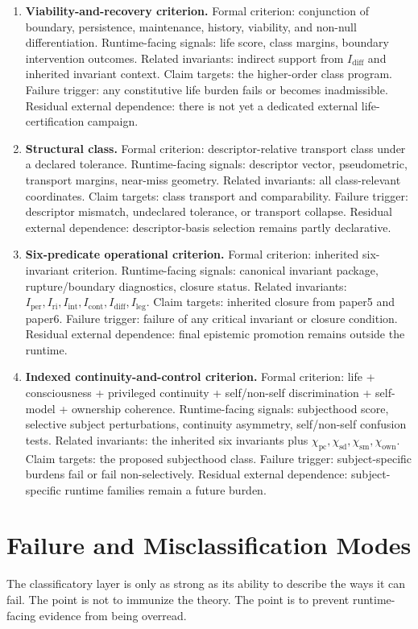 \documentclass[11pt,a4paper]{article}
\theoremstyle{definition}
\newcommand{\Iper}{I_{\mathrm{per}}}
\newcommand{\Iri}{I_{\mathrm{ri}}}
\newcommand{\Iint}{I_{\mathrm{int}}}
\newcommand{\Icont}{I_{\mathrm{cont}}}
\newcommand{\Idiff}{I_{\mathrm{diff}}}
\newcommand{\Ileg}{I_{\mathrm{leg}}}
\newcommand{\Priv}{\chi_{\mathrm{pc}}}
\newcommand{\SelfDisc}{\chi_{\mathrm{sd}}}
\newcommand{\SelfModel}{\chi_{\mathrm{sm}}}
\newcommand{\Own}{\chi_{\mathrm{own}}}
\begin{document}
\begin{enumerate}[leftmargin=*,itemsep=0.5em]
\item \textbf{Viability-and-recovery criterion.} Formal criterion: conjunction of boundary, persistence, maintenance, history, viability, and non-null differentiation. Runtime-facing signals: life score, class margins, boundary intervention outcomes. Related invariants: indirect support from $\Idiff$ and inherited invariant context. Claim targets: the higher-order class program. Failure trigger: any constitutive life burden fails or becomes inadmissible. Residual external dependence: there is not yet a dedicated external life-certification campaign.

\item \textbf{Structural class.} Formal criterion: descriptor-relative transport class under a declared tolerance. Runtime-facing signals: descriptor vector, pseudometric, transport margins, near-miss geometry. Related invariants: all class-relevant coordinates. Claim targets: class transport and comparability. Failure trigger: descriptor mismatch, undeclared tolerance, or transport collapse. Residual external dependence: descriptor-basis selection remains partly declarative.

\item \textbf{Six-predicate operational criterion.} Formal criterion: inherited six-invariant criterion. Runtime-facing signals: canonical invariant package, rupture/boundary diagnostics, closure status. Related invariants: $\Iper,\Iri,\Iint,\Icont,\Idiff,\Ileg$. Claim targets: inherited closure from paper5 and paper6. Failure trigger: failure of any critical invariant or closure condition. Residual external dependence: final epistemic promotion remains outside the runtime.

\item \textbf{Indexed continuity-and-control criterion.} Formal criterion: life + consciousness + privileged continuity + self/non-self discrimination + self-model + ownership coherence. Runtime-facing signals: subjecthood score, selective subject perturbations, continuity asymmetry, self/non-self confusion tests. Related invariants: the inherited six invariants plus $\Priv,\SelfDisc,\SelfModel,\Own$. Claim targets: the proposed subjecthood class. Failure trigger: subject-specific burdens fail or fail non-selectively. Residual external dependence: subject-specific runtime families remain a future burden.
\end{enumerate}

\section{Failure and Misclassification Modes}
The classificatory layer is only as strong as its ability to describe the ways it can fail. The point is not to immunize the theory. The point is to prevent runtime-facing evidence from being overread.
\end{document}
